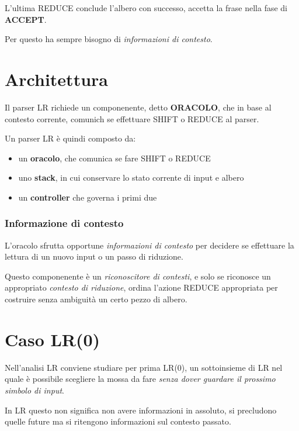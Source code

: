 L'ultima REDUCE conclude l'albero con successo, accetta la frase nella fase di \textbf{ACCEPT}.

Per questo ha sempre bisogno di \textit{informazioni di contesto}.

\section{Architettura}
Il parser LR richiede un componenente, detto \textbf{ORACOLO}, che in base al contesto corrente, comunich se effettuare SHIFT o REDUCE al parser.

Un parser LR è quindi composto da:
\begin{itemize}
    \item un \textbf{oracolo}, che comunica se fare SHIFT o REDUCE
    \item uno \textbf{stack}, in cui conservare lo stato corrente di input e albero
    \item un \textbf{controller} che governa i primi due
\end{itemize}

\subsubsection{Informazione di contesto}
L'oracolo sfrutta opportune \textit{informazioni di contesto} per decidere se effettuare la lettura di un nuovo input o un passo di riduzione.

Questo componenente è un \textit{riconoscitore di contesti}, e solo se riconosce un appropriato \textit{contesto di riduzione}, ordina l'azione REDUCE appropriata per costruire senza ambiguità un certo pezzo di albero.

\section{Caso LR(0)}

Nell'analisi LR conviene studiare per prima LR(0), un sottoinsieme di LR nel quale è possibile scegliere la mossa da fare \textit{senza dover guardare il prossimo simbolo di input}.

In LR questo non significa non avere informazioni in assoluto, si precludono quelle future ma si ritengono informazioni sul contesto passato.

